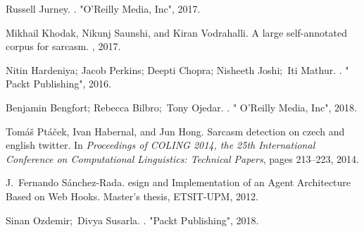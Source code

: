 \begin{thebibliography}{10}
Russell Jurney.
.
\newblock "O'Reilly Media, Inc", 2017.

Mikhail Khodak, Nikunj Saunshi, and Kiran Vodrahalli.
\newblock A large self-annotated corpus for sarcasm.
, 2017.

Nitin Hardeniya; Jacob Perkins; Deepti Chopra; Nisheeth Joshi;~Iti Mathur.
.
\newblock " Packt Publishing", 2016.

Benjamin Bengfort; Rebecca Bilbro;~Tony Ojedar.
.
\newblock " O'Reilly Media, Inc", 2018.

Tom{\'a}{\v{s}} Pt{\'a}{\v{c}}ek, Ivan Habernal, and Jun Hong.
\newblock Sarcasm detection on czech and english twitter.
\newblock In {\em Proceedings of COLING 2014, the 25th International Conference
  on Computational Linguistics: Technical Papers}, pages 213--223, 2014.

J.~Fernando S{\'a}nchez-Rada.
esign and {I}mplementation of an {A}gent {A}rchitecture {B}ased on
  {W}eb {H}ooks.
\newblock Master's thesis, ETSIT-UPM, 2012.

Sinan Ozdemir;~Divya Susarla.
.
\newblock "Packt Publishing", 2018.

\end{thebibliography}

